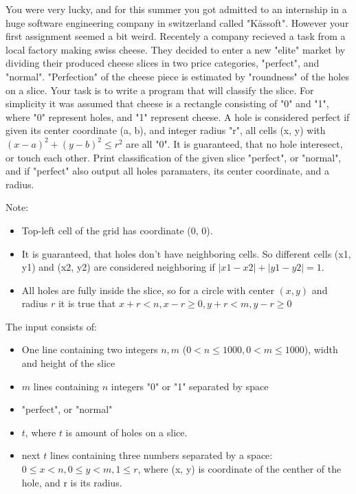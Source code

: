 \problemname{\problemyamlname}


\newcommand{\maxn}{1000}

You were very lucky, and for this summer you got admitted to an internship in a huge software engineering company in switzerland called "Kässoft". 
However your first assignment seemed a bit weird. Recentely a company recieved a task from a local factory making swiss cheese. They decided to enter a new "elite" market by dividing their produced cheese slices in two price categories, "perfect", and "normal".
"Perfection" of the cheese piece is estimated by "roundness" of the holes on a slice. Your task is to write a program that will classify the slice.
For simplicity it was assumed that cheese is a rectangle consisting of "0" and "1", where "0" represent holes, and "1" represent cheese. 
A hole is considered perfect if given its center coordinate (a, b), and integer radius "r", all cells (x, y) with $(x - a)^2 + (y - b)^2 \leq r^2$ are all "0". It is guaranteed, that no hole interesect, or touch each other.
Print classification of the given slice "perfect", or "normal", and if "perfect" also output all holes paramaters, its center coordinate, and a radius.

Note:
\begin{itemize}
    \item Top-left cell of the grid has coordinate (0, 0).
    \item It is guaranteed, that holes don't have neighboring cells. So different cells (x1, y1) and (x2, y2) are considered neighboring if $|x1 - x2| + |y1 - y2| = 1$.
    \item All holes are fully inside the slice, so for a circle with center $(x, y)$ and radius $r$ it is true that $x + r < n, x - r \geq 0, y + r < m, y - r \geq 0$
\end{itemize}

\begin{Input}
    The input consists of:
    \begin{itemize}
        \item One line containing two integers $n, m$ ($0 < n\leq \maxn, 0 < m \leq \maxn$), width and height of the slice
        \item $m$ lines containing $n$ integers "0" or "1" separated by space
    \end{itemize}
\end{Input}

\begin{Output}
    \begin{itemize}
        \item "perfect", or "normal"
        \item $t$, where $t$ is amount of holes on a slice.
        \item next $t$ lines containing three numbers separated by a space: $0 \leq x < n, 0 \leq y < m, 1 \leq r$, where (x, y) is coordinate of the centher of the hole, and r is its radius.
    \end{itemize}
    
\end{Output}


